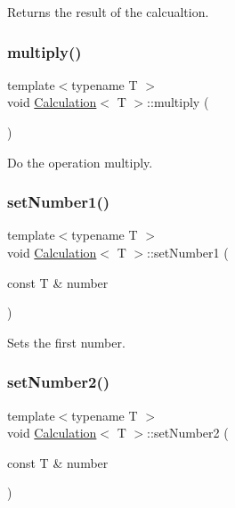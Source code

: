 Returns the result of the calcualtion. 

\mbox{\label{class_calculation_ad83eb07a25a6ed6c5d09160a4ed0fb5c}} 
\subsubsection{\texorpdfstring{multiply()}{multiply()}}
{\footnotesize\ttfamily template$<$typename T $>$ \\
void \mbox{\hyperlink{class_calculation}{Calculation}}$<$ T $>$\+::multiply (\begin{DoxyParamCaption}{ }\end{DoxyParamCaption})}



Do the operation multiply. 

\mbox{\label{class_calculation_a915d1db1cf80900f7a57af981a5f275a}} 
\subsubsection{\texorpdfstring{set\+Number1()}{setNumber1()}}
{\footnotesize\ttfamily template$<$typename T $>$ \\
void \mbox{\hyperlink{class_calculation}{Calculation}}$<$ T $>$\+::set\+Number1 (\begin{DoxyParamCaption}\item[{const T \&}]{number }\end{DoxyParamCaption})}



Sets the first number. 

\mbox{\label{class_calculation_a68b771f19c2f08ca95ca819dd848739f}} 
\subsubsection{\texorpdfstring{set\+Number2()}{setNumber2()}}
{\footnotesize\ttfamily template$<$typename T $>$ \\
void \mbox{\hyperlink{class_calculation}{Calculation}}$<$ T $>$\+::set\+Number2 (\begin{DoxyParamCaption}\item[{const T \&}]{number }\end{DoxyParamCaption})}



